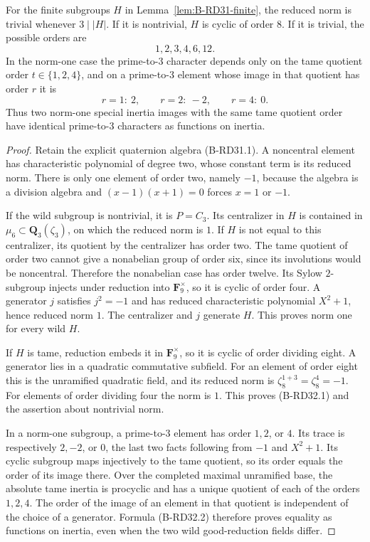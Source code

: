 \begin{lemma}
\label{lem:B-RD32-norm}
For the finite subgroups $H$ in Lemma~\ref{lem:B-RD31-finite},
the reduced norm is trivial whenever $3\mid |H|$.
If it is nontrivial, $H$ is cyclic of order $8$.
If it is trivial, the possible orders are
\[
                           1,2,3,4,6,12.
                                                        \tag{B-RD32.1}
\]
In the norm-one case the prime-to-$3$ character depends only on
the tame quotient order $t\in\{1,2,4\}$, and on a prime-to-$3$
element whose image in that quotient has order $r$ it is
\[
       r=1:\ 2,\qquad r=2:\ -2,\qquad r=4:\ 0.
                                                        \tag{B-RD32.2}
\]
Thus two norm-one special inertia images with the same tame
quotient order have identical prime-to-$3$ characters as
functions on inertia.
\end{lemma}
\begin{proof}
Retain the explicit quaternion algebra (B-RD31.1). A noncentral
element has characteristic polynomial of degree two, whose
constant term is its reduced norm. There is only one element
of order two, namely $-1$, because the algebra is a division
algebra and $(x-1)(x+1)=0$ forces $x=1$ or $-1$.

If the wild subgroup is nontrivial, it is $P=C_3$. Its
centralizer in $H$ is contained in
$\mu_6\subset\mathbf Q_3(\zeta_3)$, on which the reduced norm
is $1$. If $H$ is not equal to this centralizer, its quotient
by the centralizer has order two. The tame quotient of order
two cannot give a nonabelian group of order six, since its
involutions would be noncentral. Therefore the nonabelian
case has order twelve. Its Sylow $2$-subgroup injects under
reduction into $\mathbf F_9^\times$, so it is cyclic of order
four. A generator $j$ satisfies $j^2=-1$ and has reduced
characteristic polynomial $X^2+1$, hence reduced norm $1$.
The centralizer and $j$ generate $H$. This proves norm one
for every wild $H$.

If $H$ is tame, reduction embeds it in $\mathbf F_9^\times$,
so it is cyclic of order dividing eight. A generator lies in
a quadratic commutative subfield. For an element of order
eight this is the unramified quadratic field, and its reduced
norm is $\zeta_8^{1+3}=\zeta_8^4=-1$. For elements of order
dividing four the norm is $1$. This proves (B-RD32.1) and
the assertion about nontrivial norm.

In a norm-one subgroup, a prime-to-$3$ element has order
$1,2$, or $4$. Its trace is respectively $2,-2$, or $0$,
the last two facts following from $-1$ and $X^2+1$.
Its cyclic subgroup maps injectively to the tame quotient,
so its order equals the order of its image there.
Over the completed maximal unramified base, the absolute
tame inertia is procyclic and has a unique quotient of each
of the orders $1,2,4$. The order of the image of an element
in that quotient is independent of the choice of a generator.
Formula (B-RD32.2) therefore proves equality as functions on
inertia, even when the two wild good-reduction fields differ.
\end{proof}

